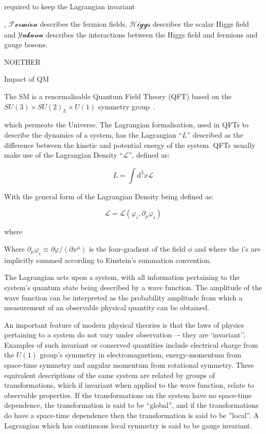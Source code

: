 required to keep the Lagrangian invariant


, $\mathcal{Fermion}$ describes the fermion fields, $\mathcal{Higgs}$ describes the scalar Higgs field and $\mathcal{Yukawa}$ describes the interactions between the Higgs field and fermions and gauge bosons.

NOETHER

Impact of QM

The SM is a renormalisable Quantum Field Theory (QFT) based on the $SU(3)\times SU(2)_{L} \times U(1)$ symmetry group~\cite{LagrangiansSM}.


 which permeate the Universe. 
The Lagrangian formalisation, used in QFTs to describe the dynamics of a system, has the Lagrangian ``$L$'' described as the difference between the kinetic and potential energy of the system\cite{LagrangiansSM}. 
QFTs usually make use of the Lagrangian Density ``$\mathcal{L}$'', defined as\cite{QFT}:

\begin{equation}
L = \int \mathrm{d^{3}}x \mathcal{L}
\end{equation}

With the general form of the Lagrangian Density being defined as:

\begin{equation}
\mathcal{L} = \mathcal{L} ( \varphi_{i}, \partial _{\mu} \varphi_{i} )
\end{equation}


where 


Where $\partial _{\mu}\varphi_{i} \equiv \partial \varphi / (\partial x^{\mu} )$ is the four-gradient of the field $\phi$ and where the i's are implicitly summed according to Einstein's summation convention\cite{ElectroweakStrong}.

The Lagrangian acts upon a system, with all information pertaining to the system's quantum state being described by a wave function. 
The amplitude of the wave function can be interpreted as the probability amplitude from which a measurement of an observable physical quantity can be obtained\cite{Isham}. 

An important feature of modern physical theories is that the laws of physics pertaining to a system do not vary under observation –- they are `invariant''. 
Examples of such invariant or conserved quantities include electrical charge from the $U(1)$ group’s symmetry in electromagnetism, energy-momentum from space-time symmetry and angular momentum from rotational symmetry\cite{Haywood}. 
These equivalent descriptions of the same system are related by groups of transformations, which if invariant when applied to the wave function, relate to observable properties\cite{QFT}. 
If the transformations on the system have no space-time dependence, the transformation is said to be ``global'', and if the transformations do have a space-time dependence then the transformation is said to be ''local''. 
A Lagrangian which has continuous local symmetry is said to be gauge invariant\cite{Haywood}. 

